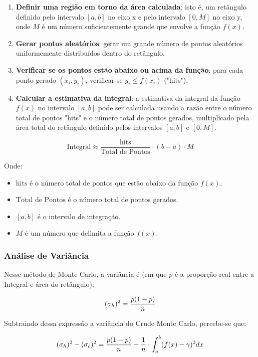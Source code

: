 \documentclass{article}
\begin{document}
\begin{enumerate}
  \item \textbf{Definir uma região em torno da área calculada}: isto é, um retângulo definido pelo intervalo $[a, b]$ no eixo x e pelo intervalo $[0, M]$ no eixo y, onde $M$ é um número suficientemente grande que envolve a função $f(x)$.
  
  \item \textbf{Gerar pontos aleatórios}: gerar um grande número de pontos aleatórios uniformemente distribuídos dentro do retângulo.
  
  \item \textbf{Verificar se os pontos estão abaixo ou acima da função}: para cada ponto gerado $(x_i, y_i)$, verificar se $y_i \leq f(x_i)$ ("hits").
  
  \item \textbf{Calcular a estimativa da integral}: a estimativa da integral da função $f(x)$ no intervalo $[a, b]$ pode ser calculada usando a razão entre o número total de pontos "hits" e o número total de pontos gerados, multiplicado pela área total do retângulo definido pelos intervalos $[a, b]$ e $[0, M]$.
\end{enumerate}

\[
\text{Integral} \approx \frac{\text{hits}}{\text{Total de Pontos}} \cdot (b - a) \cdot M
\]

Onde:
\begin{itemize}
  \item $\text{hits}$ é o número total de pontos que estão abaixo da função $f(x)$.
  \item $\text{Total de Pontos}$ é o número total de pontos gerados.
  \item $[a, b]$ é o intervalo de integração.
  \item $M$ é um número que delimita a função $f(x)$.
\end{itemize}

\subsubsection{Análise de Variância}
Nesse método de Monte Carlo, a variância é (em que $p$ é a proporção real entre a Integral e área do retângulo):

\[
\text(\sigma_{h})^2 = \frac{p(1-p)}{n}
\]

Subtraindo dessa expressão a variância do Crude Monte Carlo, percebe-se que:

\[
\text(\sigma_{h})^2 - (\sigma_{c})^2 = \frac{p(1-p)}{n} -\frac{1}{n}\cdot\int_a^b(f(x) - \gamma)^2dx
\]
\end{document}
